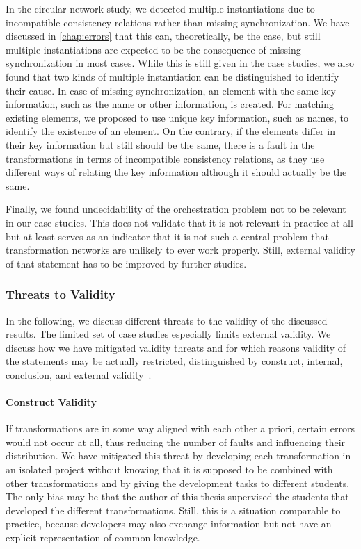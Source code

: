 In the circular network study, we detected multiple instantiations due to incompatible consistency relations rather than missing synchronization.
We have discussed in \autoref{chap:errors} that this can, theoretically, be the case, but still multiple instantiations are expected to be the consequence of missing synchronization in most cases.
While this is still given in the case studies, we also found that two kinds of multiple instantiation can be distinguished to identify their cause.
In case of missing synchronization, an element with the same key information, such as the name or other information, is created.
For matching existing elements, we proposed to use unique key information, such as names, to identify the existence of an element.
On the contrary, if the elements differ in their key information but still should be the same, there is a fault in the transformations in terms of incompatible consistency relations, as they use different ways of relating the key information although it should actually be the same.

Finally, we found undecidability of the orchestration problem not to be relevant in our case studies.
This does not validate that it is not relevant in practice at all but at least serves as an indicator that it is not such a central problem that transformation networks are unlikely to ever work properly.
Still, external validity of that statement has to be improved by further studies.


\subsubsection{Threats to Validity}

In the following, we discuss different threats to the validity of the discussed results.
The limited set of case studies especially limits external validity.
We discuss how we have mitigated validity threats and for which reasons validity of the statements may be actually restricted, distinguished by construct, internal, conclusion, and external validity~\cite{wohlin2012validity-Book}.

\paragraph{Construct Validity}
If transformations are in some way aligned with each other a priori, certain errors would not occur at all, thus reducing the number of faults and influencing their distribution.
We have mitigated this threat by developing each transformation in an isolated project without knowing that it is supposed to be combined with other transformations and by giving the development tasks to different students.
The only bias may be that the author of this thesis supervised the students that developed the different transformations.
Still, this is a situation comparable to practice, because developers may also exchange information but not have an explicit representation of common knowledge.

